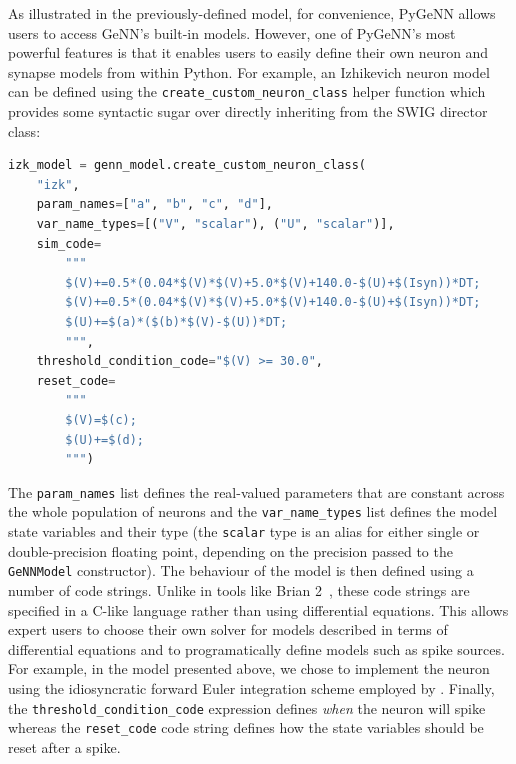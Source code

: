 \documentclass[utf8]{frontiersSCNS} %
\begin{document}
As illustrated in the previously-defined model, for convenience, PyGeNN allows users to access GeNN's built-in models.
However, one of PyGeNN's most powerful features is that it enables users to easily define their own neuron and synapse models from within Python.
For example, an Izhikevich neuron model~\citep{Izhikevich2003a} can be defined using the \lstinline{create_custom_neuron_class} helper function which provides some syntactic sugar over directly inheriting from the SWIG director class:
%
\begin{lstlisting}[language=Python]
izk_model = genn_model.create_custom_neuron_class(
    "izk",
    param_names=["a", "b", "c", "d"],
    var_name_types=[("V", "scalar"), ("U", "scalar")],
    sim_code=
        """
        $(V)+=0.5*(0.04*$(V)*$(V)+5.0*$(V)+140.0-$(U)+$(Isyn))*DT;
        $(V)+=0.5*(0.04*$(V)*$(V)+5.0*$(V)+140.0-$(U)+$(Isyn))*DT;
        $(U)+=$(a)*($(b)*$(V)-$(U))*DT;
        """,
    threshold_condition_code="$(V) >= 30.0",
    reset_code=
        """
        $(V)=$(c);
        $(U)+=$(d);
        """)
\end{lstlisting}
%
The \lstinline{param_names} list defines the real-valued parameters that are constant across the whole population of neurons and the \lstinline{var_name_types} list defines the model state variables and their type (the \lstinline{scalar} type is an alias for either single or double-precision floating point, depending on the precision passed to the \lstinline{GeNNModel} constructor).
The behaviour of the model is then defined using a number of code strings.
Unlike in tools like Brian 2~\citep{Stimberg2019}, these code strings are specified in a C-like language rather than using differential equations.
This allows expert users to choose their own solver for models described in terms of differential equations and to programatically define models such as spike sources.
For example, in the model presented above, we chose to implement the neuron using the idiosyncratic forward Euler integration scheme employed by \citet{Izhikevich2003a}.
Finally, the \lstinline{threshold_condition_code} expression defines \emph{when} the neuron will spike whereas the \lstinline{reset_code} code string defines how the state variables should be reset after a spike.
%
\end{document}
